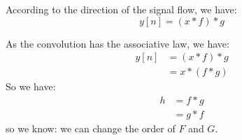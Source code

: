    According to the direction of the signal flow, we have:
        \begin{equation}
            y[n] = (x\ast f) \ast g
        \end{equation}
    
    As the convolution has the associative law, we have:
        \begin{equation}
            \begin{aligned}
                y[n] &= (x\ast f) \ast g \\
                     &= x \ast (f \ast g) 
            \end{aligned}
        \end{equation}
    So we have:
        \begin{equation}
            \begin{aligned}
            h &=  f \ast g \\
              &=  g \ast f
            \end{aligned}
        \end{equation}
    so we know: we can change the order of $F$ and $G$.

    
    
    
    
    





    
    
    
    
    
    
    
    
    
    
    
    


    
    
    
        
    




    





    

    
    

    

    
    
    